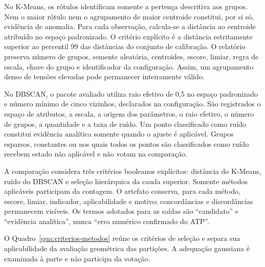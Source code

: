 \documentclass[
	12pt,				%
	openright,			%
	oneside,			%
	a4paper,			%
	chapter=TITLE,		%
	section=TITLE,		%
	subsection=TITLE,	%
	subsubsection=TITLE,%
	english,			%
	brazilian			%
	]{abntex2}
\theoremstyle{definition}
\begin{document}
No K-Means, os rótulos identificam somente a pertença descritiva aos grupos.
Nem o maior rótulo nem o agrupamento de maior centroide constitui, por si só,
evidência de anomalia. Para cada observação, calcula-se a distância ao
centroide atribuído no espaço padronizado. O critério explícito é a distância
estritamente superior ao percentil 99 das distâncias do conjunto de
calibração. O relatório preserva número de grupos, semente aleatória,
centroides, escore, limiar, regra de escala, chave do grupo e identificador da
configuração. Assim, um agrupamento denso de tensões elevadas pode permanecer
inteiramente válido.

No DBSCAN, o pacote avaliado utiliza raio efetivo de 0,5 no espaço
padronizado e número mínimo de cinco vizinhos, declarados na configuração.
São registrados o
espaço de atributos, a escala, a origem dos parâmetros, o raio efetivo, o
número de grupos, a quantidade e a taxa de ruído. Um ponto classificado como
ruído constitui evidência analítica somente quando o ajuste é aplicável.
Grupos esparsos, constantes ou nos quais todos os pontos são classificados
como ruído recebem estado não aplicável e não votam na comparação.

A comparação considera três critérios booleanos explícitos:
distância do K-Means, ruído do DBSCAN e seleção hierárquica da cauda superior. Somente métodos aplicáveis participam
da contagem. O artefato conserva, para cada método, escore, limiar, indicador,
aplicabilidade e motivo; concordâncias e discordâncias permanecem visíveis.
Os termos adotados para as saídas são ``candidato'' e ``evidência
analítica'', nunca ``erro numérico confirmado do ATP''.

O Quadro~\ref{qua:criterios-metodos} reúne os critérios de seleção e
separa sua aplicabilidade da avaliação geométrica das partições. A
adequação gaussiana é examinada à parte e não participa da votação.
\end{document}
